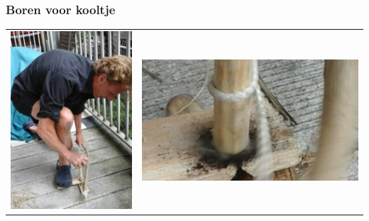 \documentclass[a4paper, handout]{beamer}
\begin{document}
\begin{frame}
	\frametitle{Boren voor kooltje}
	\begin{tabular}{ c c }
		\includegraphics[scale=0.22]{boren-1}
		&
		\includegraphics[scale=0.32]{boren-2}
		\\

\end{tabular}
\end{frame}
\end{document}
